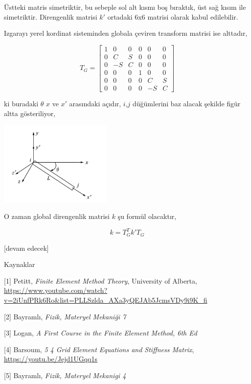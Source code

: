\documentclass[12pt,fleqn]{article}\usepackage{../../common}
\begin{document}
Üstteki matris simetriktir, bu sebeple sol alt kısmı boş bıraktık, üst sağ kısım
ile simetriktir. Direngenlik matrisi $k'$ ortadaki 6x6 matrisi olarak kabul
edilebilir.

Izgarayı yerel kordinat sisteminden globala çeviren transform matrisi ise
alttadır,

$$
T_G = \left[\begin{array}{cccccc}
1 & 0 & 0 & 0 & 0 & 0 \\
0 & C & S & 0 & 0 & 0 \\ 
0 & -S & C & 0 & 0 & 0 \\ 
0 & 0 & 0 & 1 & 0 & 0 \\ 
0 & 0 & 0 & 0 & C & S \\ 
0 & 0 & 0 & 0 & -S & C 
\end{array}\right]
$$

ki buradaki $\theta$ $x$ ve $x'$ arasındaki açıdır, $i$,$j$ düğümlerini baz
alacak şekilde figür altta gösteriliyor,

\includegraphics[width=15em]{compscieng_bpp43fem_05.jpg}

O zaman global direngenlik matrisi $k$ şu formül olacaktır,

$$
k = T_G^T k' T_G
$$

[devam edecek]

Kaynaklar

[1] Petitt, {\em Finite Element Method Theory}, University of Alberta,
    \url{https://www.youtube.com/watch?v=2iUnfPRk6Ro&list=PLLSzlda_AXa3yQEJAb5JcmsVDy9i9K_fi}

[2] Bayramlı, {\em Fizik, Materyel Mekaniği 7}

[3] Logan, {\em A First Course in the Finite Element Method, 6th Ed}

[4] Barsoum, {\em 5 4 Grid Element Equations and Stiffness Matrix},
    \url{https://youtu.be/Jejd1UGqq1s}

[5] Bayramlı, {\em Fizik, Materyel Mekanigi 4}
\end{document}
